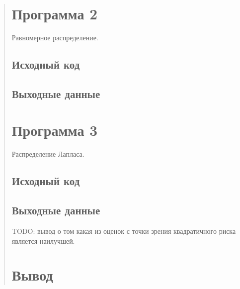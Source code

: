 \documentclass{article}
\begin{document}
\begin{quote}
\section{Программа 2}
	Равномерное распределение. \\
\subsection{Исходный код}
	
\subsection{Выходные данные}

\section{Программа 3}
        Распределение Лапласа. \\
\subsection{Исходный код}
        
\subsection{Выходные данные}
	TODO: вывод о том какая из оценок с точки зрения квадратичного риска является наилучшей.
\section{Вывод}
\end{quote}
\end{document}
